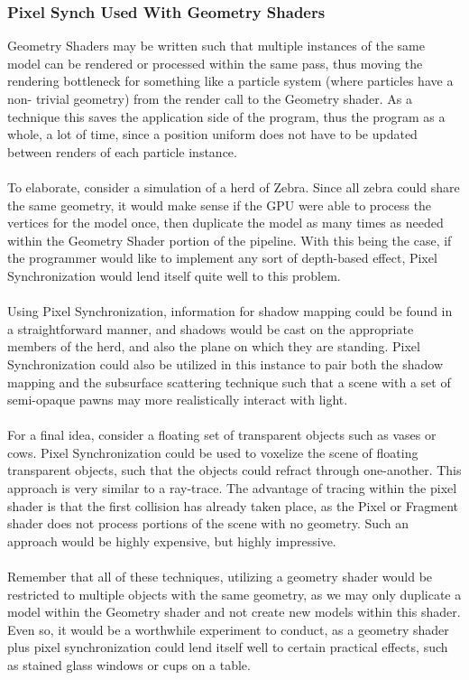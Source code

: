 \documentclass[a4paper, 12pt]{article}
\begin{document}
\subsubsection{Pixel Synch Used With Geometry Shaders}

Geometry Shaders may be written such that multiple instances of the same model
can be rendered or processed within the same pass, thus moving the rendering
bottleneck for something like a particle system (where particles have a non-
trivial geometry) from the render call to the Geometry shader. As a technique
this saves the application side of the program, thus the program as a whole, a
lot of time, since a position uniform does not have to be updated between
renders of each particle instance. \\ \\ To elaborate, consider a simulation
of a herd of Zebra. Since all zebra could share the same geometry, it would
make sense if the GPU were able to process the vertices for the model once,
then duplicate the model as many times as needed within the Geometry Shader
portion of the pipeline. With this being the case, if the programmer would
like to implement any sort of depth-based effect, Pixel Synchronization would
lend itself quite well to this problem. \\ \\ Using Pixel Synchronization,
information for shadow mapping could be found in a straightforward manner, and
shadows would be cast on the appropriate members of the herd, and also the
plane on which they are standing. Pixel Synchronization could also be utilized
in this instance to pair both the shadow mapping and the subsurface scattering
technique such that a scene with a set of semi-opaque pawns may more
realistically interact with light. \\ \\ For a final idea, consider a floating
set of transparent objects such as vases or cows. Pixel Synchronization could
be used to voxelize the scene of floating transparent objects, such that the
objects could refract through one-another. This approach is very similar to a
ray-trace. The advantage of tracing within the pixel shader is that the first
collision has already taken place, as the Pixel or Fragment shader does not
process portions of the scene with no geometry. Such an approach would be
highly expensive, but highly impressive. \\ \\ Remember that all of these
techniques, utilizing a geometry shader would be restricted to multiple
objects with the same geometry, as we may only duplicate a model within the
Geometry shader and not create new models within this shader. Even so, it
would be a worthwhile experiment to conduct, as a geometry shader plus pixel
synchronization could lend itself well to certain practical effects, such as
stained glass windows or cups on a table.
\end{document}
